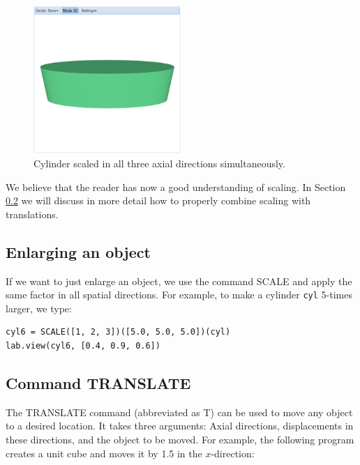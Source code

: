 \documentclass[article,A4,12pt]{llncs}
\begin{document}
\begin{figure}[!ht]
\begin{center}
\includegraphics[width=0.5\textwidth]{img/scale-5.png}
\end{center}
\vspace{-2mm}
\caption{Cylinder scaled in all three axial directions simultaneously.}
\label{fig:scale-5}
\end{figure}
\noindent
We believe that the reader has now a good understanding of scaling.
In Section \ref{sec:translate} we will discuss in more detail how
to properly combine scaling with translations. 

\subsection{Enlarging an object}
If we want to just enlarge an object, we use the command SCALE and 
apply the same factor in all spatial directions. For example, to 
make a cylinder {\tt cyl} 5-times larger, we type:

\begin{verbatim}
cyl6 = SCALE([1, 2, 3])([5.0, 5.0, 5.0])(cyl)
lab.view(cyl6, [0.4, 0.9, 0.6])
\end{verbatim}


\subsection{Command TRANSLATE} \label{sec:translate}

The TRANSLATE command (abbreviated as T) can be used to move any 
object to a desired location. It takes three arguments: Axial directions,
displacements in these directions, and the object to be moved. For example,
the following program creates a unit cube and moves it by 1.5 in the 
$x$-direction:
\end{document}
